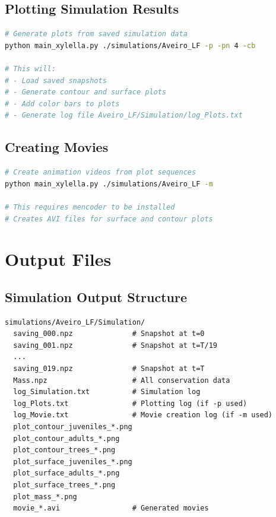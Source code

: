 \documentclass[12pt,a4paper]{report}
\begin{document}
\section{Plotting Simulation Results}

\begin{lstlisting}[language=bash]
# Generate plots from saved simulation data
python main_xylella.py ./simulations/Aveiro_LF -p -pn 4 -cb

# This will:
# - Load saved snapshots
# - Generate contour and surface plots
# - Add color bars to plots
# - Generate log file Aveiro_LF/Simulation/log_Plots.txt
\end{lstlisting}

\section{Creating Movies}

\begin{lstlisting}[language=bash]
# Create animation videos from plot sequences
python main_xylella.py ./simulations/Aveiro_LF -m

# This requires mencoder to be installed
# Creates AVI files for surface and contour plots
\end{lstlisting}

\chapter{Output Files}

\section{Simulation Output Structure}

\begin{lstlisting}
simulations/Aveiro_LF/Simulation/
  saving_000.npz              # Snapshot at t=0
  saving_001.npz              # Snapshot at t=T/19
  ...
  saving_019.npz              # Snapshot at t=T
  Mass.npz                    # All conservation data
  log_Simulation.txt          # Simulation log
  log_Plots.txt               # Plotting log (if -p used)
  log_Movie.txt               # Movie creation log (if -m used)
  plot_contour_juveniles_*.png
  plot_contour_adults_*.png
  plot_contour_trees_*.png
  plot_surface_juveniles_*.png
  plot_surface_adults_*.png
  plot_surface_trees_*.png
  plot_mass_*.png
  movie_*.avi                 # Generated movies
\end{lstlisting}
\end{document}
